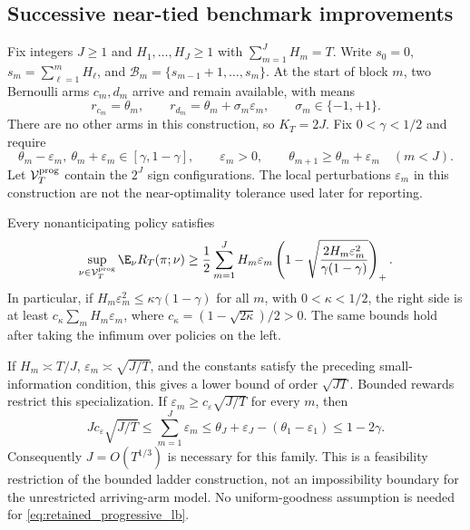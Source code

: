 \subsection{Successive near-tied benchmark improvements}

Fix integers $J\ge1$ and $H_1,\ldots,H_J\ge1$ with
$\sum_{m=1}^JH_m=T$. Write $s_0=0$,
$s_m=\sum_{\ell=1}^mH_\ell$, and
$\mathcal B_m=\{s_{m-1}+1,\ldots,s_m\}$. At the start of block $m$,
two Bernoulli arms $c_m,d_m$ arrive and remain available, with means
\[
 r_{c_m}=\theta_m,\qquad
 r_{d_m}=\theta_m+\sigma_m\varepsilon_m,
 \qquad \sigma_m\in\{-1,+1\}.
\]
There are no other arms in this construction, so $K_T=2J$. Fix
$0<\gamma<1/2$ and require
\begin{equation}
 \theta_m-\varepsilon_m,\ \theta_m+\varepsilon_m
       \in[\gamma,1-\gamma],\qquad \varepsilon_m>0,
 \qquad
 \theta_{m+1}\ge\theta_m+\varepsilon_m\quad(m<J).
 \label{eq:retained_progressive_parameters}
\end{equation}
Let $\mathcal V_T^{\rm prog}$ contain the $2^J$ sign configurations.
The local perturbations $\varepsilon_m$ in this construction are not the
near-optimality tolerance used later for reporting.

\begin{theorem}
\label{thm:retained_progressive}
Every nonanticipating policy satisfies
\begin{equation}
 \sup_{\nu\in\mathcal V_T^{\rm prog}}\E_\nu R_T(\pi;\nu)
 \ge\frac12\sum_{m=1}^JH_m\varepsilon_m
       \left(1-\sqrt{\frac{2H_m\varepsilon_m^2}
                                {\gamma(1-\gamma)}}\right)_+.
 \label{eq:retained_progressive_lb}
\end{equation}
In particular, if $H_m\varepsilon_m^2\le\kappa\gamma(1-\gamma)$ for all
$m$, with $0<\kappa<1/2$, the right side is at least
$c_\kappa\sum_m H_m\varepsilon_m$, where
$c_\kappa=(1-\sqrt{2\kappa})/2>0$. The same bounds hold after taking the
infimum over policies on the left.
\end{theorem}

If $H_m\asymp T/J$, $\varepsilon_m\asymp\sqrt{J/T}$, and the constants
satisfy the preceding small-information condition, this gives a lower bound
of order $\sqrt{JT}$. Bounded rewards restrict this specialization. If
$\varepsilon_m\ge c_\varepsilon\sqrt{J/T}$ for every $m$, then
\[
 Jc_\varepsilon\sqrt{J/T}
 \le \sum_{m=1}^J\varepsilon_m
 \le \theta_J+\varepsilon_J-(\theta_1-\varepsilon_1)
 \le1-2\gamma.
\]
Consequently $J=O(T^{1/3})$ is necessary for this family. This is a
feasibility restriction of the bounded ladder construction, not an
impossibility boundary for the unrestricted arriving-arm model. No
uniform-goodness assumption is needed for
\eqref{eq:retained_progressive_lb}. \suppproof
